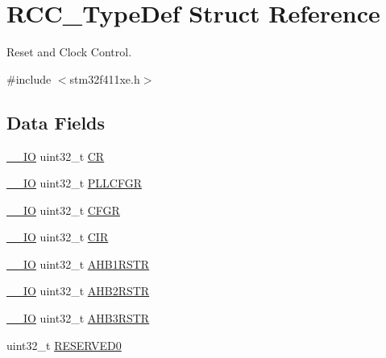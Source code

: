 \hypertarget{struct_r_c_c___type_def}{}\section{R\+C\+C\+\_\+\+Type\+Def Struct Reference}
\label{struct_r_c_c___type_def}


Reset and Clock Control.  




{\ttfamily \#include $<$stm32f411xe.\+h$>$}

\subsection*{Data Fields}
\begin{DoxyCompactItemize}
\item 
\hyperlink{core__sc300_8h_aec43007d9998a0a0e01faede4133d6be}{\+\_\+\+\_\+\+IO} uint32\+\_\+t \hyperlink{struct_r_c_c___type_def_abcb9ff48b9afb990283fefad0554b5b3}{CR}
\item 
\hyperlink{core__sc300_8h_aec43007d9998a0a0e01faede4133d6be}{\+\_\+\+\_\+\+IO} uint32\+\_\+t \hyperlink{struct_r_c_c___type_def_a2a7ccb4e23cb05a574f243f6278b7b26}{P\+L\+L\+C\+F\+GR}
\item 
\hyperlink{core__sc300_8h_aec43007d9998a0a0e01faede4133d6be}{\+\_\+\+\_\+\+IO} uint32\+\_\+t \hyperlink{struct_r_c_c___type_def_a0721b1b729c313211126709559fad371}{C\+F\+GR}
\item 
\hyperlink{core__sc300_8h_aec43007d9998a0a0e01faede4133d6be}{\+\_\+\+\_\+\+IO} uint32\+\_\+t \hyperlink{struct_r_c_c___type_def_aeadf3a69dd5795db4638f71938704ff0}{C\+IR}
\item 
\hyperlink{core__sc300_8h_aec43007d9998a0a0e01faede4133d6be}{\+\_\+\+\_\+\+IO} uint32\+\_\+t \hyperlink{struct_r_c_c___type_def_ad6abf71a348744aa3f2b7e8b214c1ca4}{A\+H\+B1\+R\+S\+TR}
\item 
\hyperlink{core__sc300_8h_aec43007d9998a0a0e01faede4133d6be}{\+\_\+\+\_\+\+IO} uint32\+\_\+t \hyperlink{struct_r_c_c___type_def_a343e0230ded55920ff2a04fbde0e5bcd}{A\+H\+B2\+R\+S\+TR}
\item 
\hyperlink{core__sc300_8h_aec43007d9998a0a0e01faede4133d6be}{\+\_\+\+\_\+\+IO} uint32\+\_\+t \hyperlink{struct_r_c_c___type_def_a39a90d838fbd0b8515f03e4a1be6374f}{A\+H\+B3\+R\+S\+TR}
\item 
uint32\+\_\+t \hyperlink{struct_r_c_c___type_def_a646631532167f3386763a2d10a881a04}{R\+E\+S\+E\+R\+V\+E\+D0}
\item 

\end{DoxyCompactItemize}

